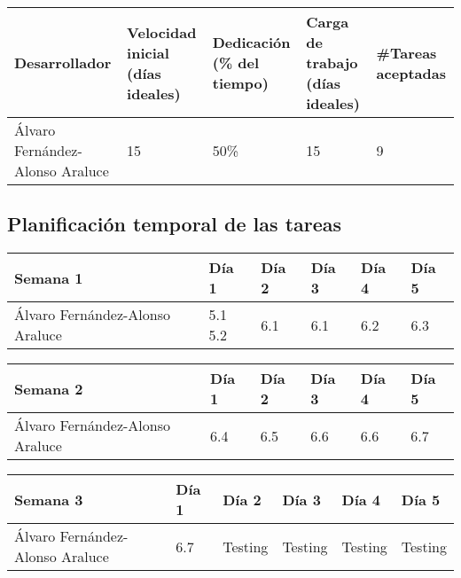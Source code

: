\begin{table}[h]
	\centering
	\begin{tabular}{| p{3cm} | p{2cm} | p{2cm} | p{2cm} | p{2cm} |}
		\rowcolor[HTML]{329A9D} 
		{\color[HTML]{FFFFFF} \textbf{Desarrollador}} & {\color[HTML]{FFFFFF} \textbf{Velocidad inicial (días ideales)}} & {\color[HTML]{FFFFFF} \textbf{Dedicación (\% del tiempo)}} & {\color[HTML]{FFFFFF} \textbf{Carga de trabajo (días ideales)}} & {\color[HTML]{FFFFFF} \textbf{\#Tareas aceptadas}}  \\ \hline
		Álvaro Fernández-Alonso Araluce & 15 & 50\% & 15 & 9 \\ \hline
	\end{tabular}
\end{table}

\subsection{Planificación temporal de las tareas}

\begin{table}[h]
	\centering
	\begin{tabular}{| p{2cm} | p{2cm} | p{2cm} | p{2cm} | p{2cm} | p{2cm} |}
		\rowcolor[HTML]{329A9D} 
		 {\color[HTML]{FFFFFF} \textbf{Semana 1}} & {\color[HTML]{FFFFFF} \textbf{Día 1}} & {\color[HTML]{FFFFFF} \textbf{Día 2}} & {\color[HTML]{FFFFFF} \textbf{Día 3}} & {\color[HTML]{FFFFFF} \textbf{Día 4}}  & {\color[HTML]{FFFFFF} \textbf{Día 5}} \\ \hline
		Álvaro Fernández-Alonso Araluce & 5.1 5.2 & 6.1 & 6.1 & 6.2 & 6.3 \\ \hline
	\end{tabular}
\end{table}

\begin{table}[h]
	\centering
	\begin{tabular}{| p{2cm} | p{2cm} | p{2cm} | p{2cm} | p{2cm} | p{2cm} |}
		\rowcolor[HTML]{329A9D} 
		{\color[HTML]{FFFFFF} \textbf{Semana 2}} & {\color[HTML]{FFFFFF} \textbf{Día 1}} & {\color[HTML]{FFFFFF} \textbf{Día 2}} & {\color[HTML]{FFFFFF} \textbf{Día 3}} & {\color[HTML]{FFFFFF} \textbf{Día 4}}  & {\color[HTML]{FFFFFF} \textbf{Día 5}} \\ \hline
		Álvaro Fernández-Alonso Araluce & 6.4 & 6.5 & 6.6 & 6.6 & 6.7 \\ \hline
	\end{tabular}
\end{table}

\begin{table}[h]
	\centering
	\begin{tabular}{| p{2cm} | p{2cm} | p{2cm} | p{2cm} | p{2cm} | p{2cm} |}
		\rowcolor[HTML]{329A9D} 
		{\color[HTML]{FFFFFF} \textbf{Semana 3}} & {\color[HTML]{FFFFFF} \textbf{Día 1}} & {\color[HTML]{FFFFFF} \textbf{Día 2}} & {\color[HTML]{FFFFFF} \textbf{Día 3}} & {\color[HTML]{FFFFFF} \textbf{Día 4}}  & {\color[HTML]{FFFFFF} \textbf{Día 5}} \\ \hline
		Álvaro Fernández-Alonso Araluce & 6.7 & Testing & Testing & Testing & Testing \\ \hline
	\end{tabular}
\end{table}

